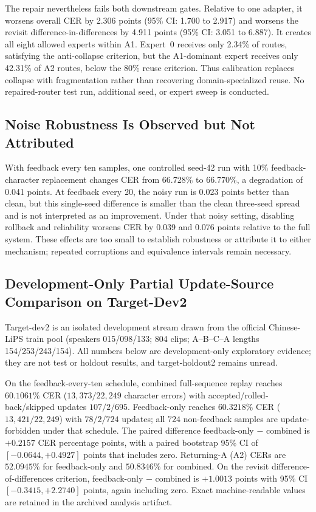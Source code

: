The repair nevertheless fails both downstream gates. Relative to one adapter, it worsens overall CER by 2.306 points (95\% CI: 1.700 to 2.917) and worsens the revisit difference-in-differences by 4.911 points (95\% CI: 3.051 to 6.887). It creates all eight allowed experts within A1. Expert~0 receives only 2.34\% of routes, satisfying the anti-collapse criterion, but the A1-dominant expert receives only 42.31\% of A2 routes, below the 80\% reuse criterion. Thus calibration replaces collapse with fragmentation rather than recovering domain-specialized reuse. No repaired-router test run, additional seed, or expert sweep is conducted.

\subsection{Noise Robustness Is Observed but Not Attributed}

With feedback every ten samples, one controlled seed-42 run with 10\% feedback-character replacement changes CER from 66.728\% to 66.770\%, a degradation of 0.041 points. At feedback every 20, the noisy run is 0.023 points better than clean, but this single-seed difference is smaller than the clean three-seed spread and is not interpreted as an improvement. Under that noisy setting, disabling rollback and reliability worsens CER by 0.039 and 0.076 points relative to the full system. These effects are too small to establish robustness or attribute it to either mechanism; repeated corruptions and equivalence intervals remain necessary.

\subsection{Development-Only Partial Update-Source Comparison on Target-Dev2}

Target-dev2 is an isolated development stream drawn from the official Chinese-LiPS train pool (speakers 015/098/133; 804 clips; A--B--C--A lengths 154/253/243/154). All numbers below are development-only exploratory evidence; they are not test or holdout results, and target-holdout2 remains unread.

On the feedback-every-ten schedule, combined full-sequence replay reaches $60.1061\%$ CER ($13{,}373/22{,}249$ character errors) with accepted/rolled-back/skipped updates $107/2/695$. Feedback-only reaches $60.3218\%$ CER ($13{,}421/22{,}249$) with $78/2/724$ updates; all $724$ non-feedback samples are update-forbidden under that schedule. The paired difference feedback-only $-$ combined is $+0.2157$ CER percentage points, with a paired bootstrap 95\% CI of $[-0.0644,+0.4927]$ points that includes zero. Returning-A (A2) CERs are $52.0945\%$ for feedback-only and $50.8346\%$ for combined. On the revisit difference-of-differences criterion, feedback-only $-$ combined is $+1.0013$ points with 95\% CI $[-0.3415,+2.2740]$ points, again including zero. Exact machine-readable values are retained in the archived analysis artifact.

